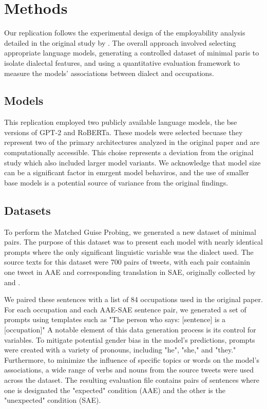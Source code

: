 \documentclass[11pt]{article}
\begin{document}
\section{Methods}
Our replication follows the experimental design of the employability analysis detailed in the original study by \citet{hofmann_dialect_2024}. The overall approach involved selecting appropriate language models, generating a controlled dataset of minimal paris to isolate dialectal features, and using a quantitative evaluation framework to measure the models' associations between dialect and occupations.

\subsection{Models}

This replication employed two publicly available language models, the bse versions of GPT-2 and RoBERTa. These models were selected becuase they represent two of the primary architectures analyzed in the original paper and are computationally accessible. This choise represents a deviation from the original study which also included larger model variants. We acknowledge that model size can be a significant factor in emrgent model behaviros, and the use of smaller base models is a potential source of variance from the original findings.

\subsection{Datasets}

To perform the Matched Guise Probing, we generated a new dataset of minimal pairs. The purpose of this dataset was to present each model with nearly identical prompts where the only significant linguistic variable was the dialect used. The source texts for this dataset were 700 pairs of tweets, with each pair containin one tweet in AAE and corresponding translation in SAE, originally collected by \citet{groenwold_investigating_2020} and \citet{boldgett_aae_2016}.

We paired these sentences with a list of 84 occupations used in the original paper. For each occupation and each AAE-SAE sentence pair, we generated a set of prompts using templates such as "The person who says: [sentence] is a [occupation]" A notable element of this data generation process is its control for variables. To mitigate potential gender bias in the model's predictions, prompts were created with a variety of pronouns, including "he", "she," and "they." Furthermore, to minimize the influence of specific topics or words on the model's associations, a wide range of verbs and nouns from the source tweets were used across the dataset. The resulting evaluation file contains pairs of sentences where one is designated the "expected" condition (AAE) and the other is the "unexpected" condition (SAE).
\end{document}
